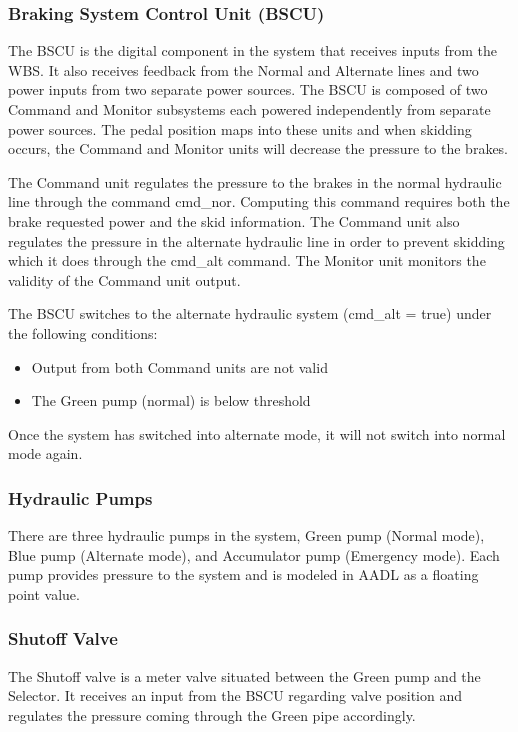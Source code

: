 \subsubsection{Braking System Control Unit (BSCU)}
The BSCU is the digital component in the system that receives inputs from the WBS. It also receives feedback from the Normal and Alternate lines and two power inputs from two separate power sources. The BSCU is composed of two Command and Monitor subsystems each powered independently from separate power sources. The pedal position maps into these units and when skidding occurs, the Command and Monitor units will decrease the pressure to the brakes. 

The Command unit regulates the pressure to the brakes in the normal hydraulic line through the command cmd\_nor. Computing this command requires both the brake requested power and the skid information. The Command unit also regulates the pressure in the alternate hydraulic line in order to prevent skidding which it does through the cmd\_alt command. The Monitor unit monitors the validity of the Command unit output. 

The BSCU switches to the alternate hydraulic system (cmd\_alt = true) under the following conditions:
\begin{itemize}
\item Output from both Command units are not valid
\item The Green pump (normal) is below threshold
\end{itemize}

Once the system has switched into alternate mode, it will not switch into normal mode again. 

\subsubsection{Hydraulic Pumps}
There are three hydraulic pumps in the system, Green pump (Normal mode), Blue pump (Alternate mode), and Accumulator pump (Emergency mode). Each pump provides pressure to the system and is modeled in AADL as a floating point value. 

\subsubsection{Shutoff Valve}

The Shutoff valve is a meter valve situated between the Green pump and the Selector. It receives an input from the BSCU regarding valve position and regulates the pressure coming through the Green pipe accordingly.  


